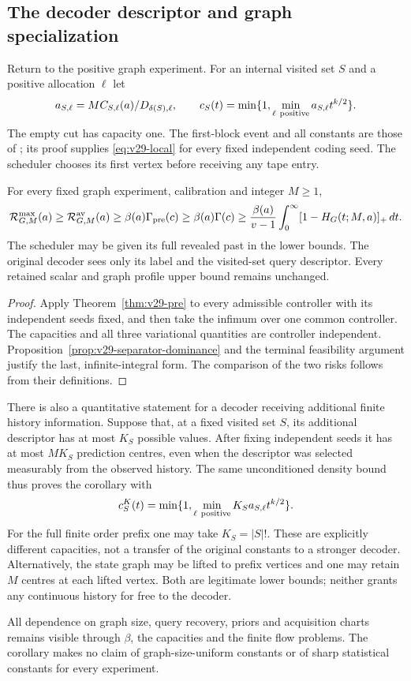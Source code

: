 \subsection{The decoder descriptor and graph specialization}
Return to the positive graph experiment. For an internal visited set
$S$ and a positive allocation $\ell$ let
\[
 a_{S,\ell}=M C_{S,\ell}(a)/D_{\delta(S),\ell},
 \qquad
 c_S(t)=\min\{1,\min_{\ell\ {\rm positive}}
                                      a_{S,\ell}t^{k/2}\}.
\]
The empty cut has capacity one. The first-block event and all constants
are those of ; its proof supplies
\eqref{eq:v29-local} for every fixed independent coding seed. The
scheduler chooses its first vertex before receiving any tape entry.

\begin{corollary}
\label{cor:v29-graph}
For every fixed graph experiment, calibration and integer $M\ge1$,
\begin{equation}\label{eq:v29-graph}
 \mathcal R^{\rm max}_{G,M}(a)\ge\mathcal R^{\rm av}_{G,M}(a)
 \ge\beta(a)\Gamma_{\rm pre}(c)
 \ge\beta(a)\Gamma(c)
 \ge\frac{\beta(a)}{v-1}\int_0^\infty[1-H_G(t;M,a)]_+\,dt.
\end{equation}
The scheduler may be given its full revealed past in the lower bounds.
The original decoder sees only its label and the visited-set query
descriptor. Every retained scalar and graph profile upper bound remains
unchanged.
\end{corollary}
\begin{proof}
Apply Theorem~\ref{thm:v29-pre} to every admissible controller with
its independent seeds fixed, and then take the infimum over one common
controller. The capacities and all three variational quantities are
controller independent. Proposition~\ref{prop:v29-separator-dominance}
and the terminal feasibility argument justify the last, infinite-integral
form. The comparison of the two risks follows from their definitions.
\end{proof}

There is also a quantitative statement for a decoder receiving additional
finite history information. Suppose that, at a fixed visited set $S$,
its additional descriptor has at most $K_S$ possible values. After fixing
independent seeds it has at most $M K_S$ prediction centres, even when
the descriptor was selected measurably from the observed history.
The same unconditioned density bound thus proves the corollary with
\begin{equation}\label{eq:v29-descriptor}
 c^{K}_S(t)=\min\{1,\min_{\ell\ {\rm positive}}
                             K_S a_{S,\ell}t^{k/2}\}.
\end{equation}
For the full finite order prefix one may take $K_S=|S|!$. These are
explicitly different capacities, not a transfer of the original
constants to a stronger decoder. Alternatively, the state graph may
be lifted to prefix vertices and one may retain $M$ centres at each
lifted vertex. Both are legitimate lower bounds; neither grants any
continuous history for free to the decoder.

All dependence on graph size, query recovery, priors and acquisition
charts remains visible through $\beta$, the capacities and the finite
flow problems. The corollary makes no claim of graph-size-uniform
constants or of sharp statistical constants for every experiment.
